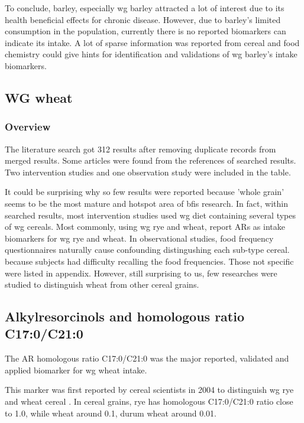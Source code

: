 To conclude, barley, especially \acrshort{wg} barley attracted a lot of interest due to its health beneficial effects for chronic disease. However, due to barley's limited consumption in the population, currently there is no reported biomarkers can indicate its intake. A lot of sparse information was reported from cereal and food chemistry could give hints for identification and validations of \acrshort{wg} barley's intake biomarkers.

\subsection{WG wheat}
\subsubsection{Overview}
The literature search got 312 results after removing duplicate records from merged results. Some articles were found from the references of searched results. Two intervention studies and one observation study were included in the table. 

It could be surprising why so few results were reported because 'whole grain' seems to be the most mature and hotspot area of \acrshort{bfis} research. 
In fact, within searched results, most intervention studies used \acrshort{wg} diet containing several types of \acrshort{wg} cereals. Most commonly, using \acrshort{wg} rye and wheat, report ARs as intake biomarkers for \acrshort{wg} rye and wheat.
In observational studies, food frequency questionnaires naturally cause confounding distingushing each sub-type cereal. because subjects had difficulty recalling the food frequencies.
Those not specific were listed in appendix. 
However, still surprising to us, few researches were studied to distinguish wheat from other cereal grains.



\subsection{Alkylresorcinols and homologous ratio C17:0/C21:0}
The AR homologous ratio C17:0/C21:0 was the major reported, validated and applied biomarker for \acrshort{wg} wheat intake. 

This marker was first reported by cereal scientists in 2004 to distinguish \acrshort{wg} rye and wheat cereal \cite{Chen2004}. In cereal grains, rye has homologous C17:0/C21:0 ratio close to 1.0, while wheat around 0.1, durum wheat around 0.01.

